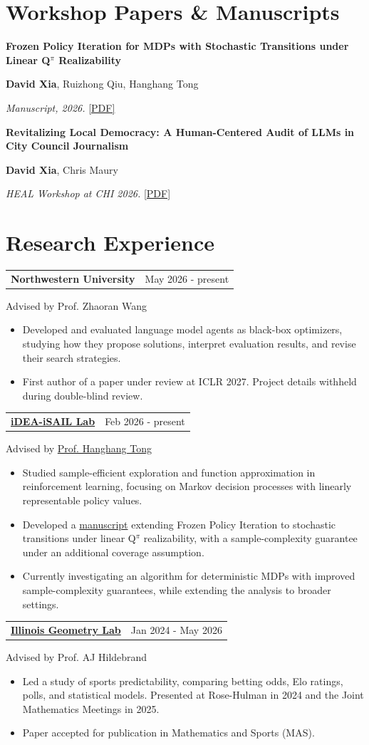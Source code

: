 \documentclass[letterpaper,11pt]{article}
\makeatletter
\newcommand{\role}[3]{\par\addvspace{3pt}\begin{tabularx}{\textwidth}{@{}Xr@{}}\textbf{#1}&\small #2\end{tabularx}\par{\small #3}\par}
\newcommand{\paper}[4]{\par\addvspace{7pt}\textbf{#1}\par #2\par\textit{#3} #4\par}
\makeatother
\begin{document}
\section{Workshop Papers \& Manuscripts}
\paper{Frozen Policy Iteration for MDPs with Stochastic Transitions under Linear Q$^{\pi}$ Realizability}
{\textbf{David Xia}, Ruizhong Qiu, Hanghang Tong}
{Manuscript, 2026.}
{\href{https://davidxia3.github.io/docs/stochastic_fpi.pdf}{[PDF]}}
\paper{Revitalizing Local Democracy: A Human-Centered Audit of LLMs in City Council Journalism}
{\textbf{David Xia}, Chris Maury}
{HEAL Workshop at CHI 2026.}
{\href{https://davidxia3.github.io/docs/heal_paper.pdf}{[PDF]}}
\section{Research Experience}
\role{Northwestern University}{May 2026 - present}{Advised by Prof. Zhaoran Wang}
\begin{itemize}
\item Developed and evaluated language model agents as black-box optimizers, studying how they propose solutions, interpret evaluation results, and revise their search strategies.
\item First author of a paper under review at ICLR 2027. Project details withheld during double-blind review.
\end{itemize}
\newpage
\role{\href{https://www.idea-isail.com/index.html}{iDEA-iSAIL Lab}}{Feb 2026 - present}{Advised by \href{http://tonghanghang.org/}{Prof. Hanghang Tong}}
\begin{itemize}
\item Studied sample-efficient exploration and function approximation in reinforcement learning, focusing on Markov decision processes with linearly representable policy values.
\item Developed a \href{https://davidxia3.github.io/docs/stochastic_fpi.pdf}{manuscript} extending Frozen Policy Iteration to stochastic transitions under linear Q$^{\pi}$ realizability, with a sample-complexity guarantee under an additional coverage assumption.
\item Currently investigating an algorithm for deterministic MDPs with improved sample-complexity guarantees, while extending the analysis to broader settings.
\end{itemize}
\role{\href{https://iml.math.illinois.edu/}{Illinois Geometry Lab}}{Jan 2024 - May 2026}{Advised by Prof. AJ Hildebrand}
\begin{itemize}
\item Led a study of sports predictability, comparing betting odds, Elo ratings, polls, and statistical models. Presented at Rose-Hulman in 2024 and the Joint Mathematics Meetings in 2025.
\item Paper accepted for publication in Mathematics and Sports (MAS).
\end{itemize}
\end{document}
